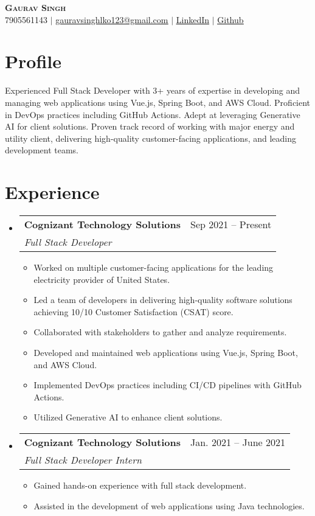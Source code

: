\documentclass[letterpaper,11pt]{article}
\makeatletter
\newcommand{\resumeItem}[1]{
  \item\small{
    {#1 \vspace{-2pt}}
  }
}
\newcommand{\resumeSubheading}[4]{
  \vspace{-2pt}\item
    \begin{tabular*}{0.97\textwidth}[t]{l@{\extracolsep{\fill}}r}
      \textbf{#1} & #2 \\
      \textit{\small#3} & \textit{\small #4} \\
    \end{tabular*}\vspace{-7pt}
}
\newcommand{\resumeSubHeadingListStart}{\begin{itemize}[leftmargin=0.15in, label={}]}
\newcommand{\resumeSubHeadingListEnd}{\end{itemize}}
\newcommand{\resumeItemListStart}{\begin{itemize}}
\newcommand{\resumeItemListEnd}{\end{itemize}\vspace{-5pt}}
\makeatother
\begin{document}

\begin{center}
    \textbf{\Huge \scshape Gaurav Singh} \\ \vspace{1pt}
    \small 7905561143 $|$ 
    \href{mailto:gauravsinghlko123@gmail.com}{\underline{gauravsinghlko123@gmail.com}} $|$ 
    \href{https://www.linkedin.com/in/er-gaurav-singh}{\underline{LinkedIn}} $|$
    \href{https://github.com/ergauravsingh}{\underline{Github}}
\end{center}


\section{Profile}
    {Experienced Full Stack Developer with 3+ years of expertise in developing and managing web applications using Vue.js, Spring Boot, and AWS Cloud. Proficient in DevOps practices including GitHub Actions. Adept at leveraging Generative AI for client solutions. Proven track record of working with major energy and utility client, delivering high-quality customer-facing applications, and leading development teams.}


\section{Experience}
  \resumeSubHeadingListStart
    \resumeSubheading
      {Cognizant Technology Solutions}{Sep 2021 -- Present}
      {Full Stack Developer}{}
      \resumeItemListStart
        \resumeItem{Worked on multiple customer-facing applications for the leading electricity provider of United States.}
        \resumeItem{Led a team of developers in delivering high-quality software solutions achieving 10/10 Customer Satisfaction (CSAT) score.}
        \resumeItem{Collaborated with stakeholders to gather and analyze requirements.}
        \resumeItem{Developed and maintained web applications using Vue.js, Spring Boot, and AWS Cloud.}
        \resumeItem{Implemented DevOps practices including CI/CD pipelines with GitHub Actions.}
        \resumeItem{Utilized Generative AI to enhance client solutions.}
      \resumeItemListEnd
    \resumeSubheading
      {Cognizant Technology Solutions}{Jan. 2021 -- June 2021}
      {Full Stack Developer Intern}{}
      \resumeItemListStart
        \resumeItem{Gained hands-on experience with full stack development.}
        \resumeItem{Assisted in the development of web applications using Java technologies.}
    \resumeItemListEnd
  \resumeSubHeadingListEnd
\end{document}
